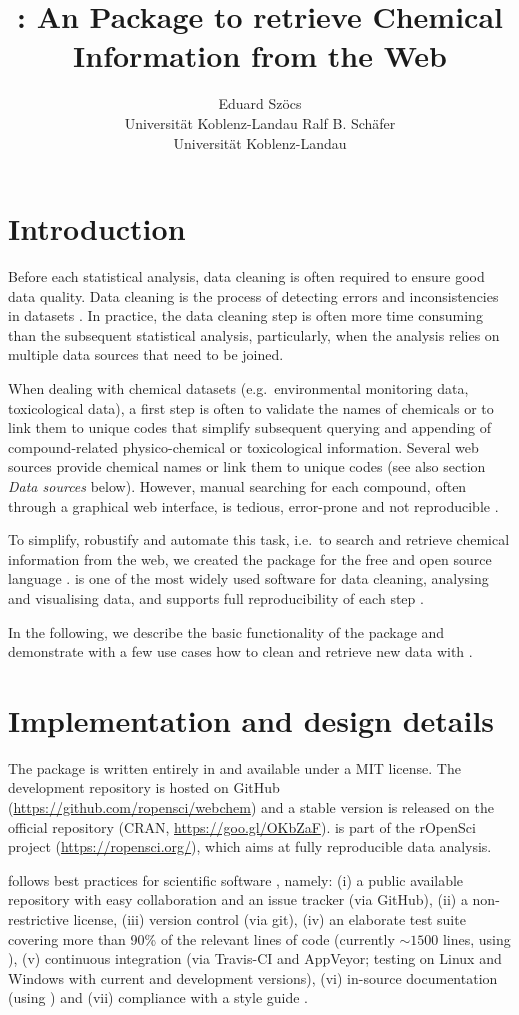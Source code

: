 \documentclass[article, shortnames]{jss}\usepackage[]{graphicx}\usepackage[]{color}
\author{Eduard Sz\"ocs\\Universit\"at Koblenz-Landau \And 
        Ralf B. Sch\"afer\\Universit\"at Koblenz-Landau}
\title{\pkg{webchem}: An \proglang{R} Package to retrieve Chemical Information from the Web}
\begin{document}
\section[Introduction]{Introduction}
Before each statistical analysis, data cleaning is often required to ensure good data quality.
Data cleaning is the process of detecting errors and inconsistencies in datasets \citep{Chapman_2005}.
In practice, the data cleaning step is often more time consuming than the subsequent statistical analysis, particularly, when the analysis relies on multiple data sources that need to be joined.

When dealing with chemical datasets (e.g.\ environmental monitoring data, toxicological data), a first step is often to validate the names of chemicals or to link them to unique codes that simplify subsequent querying and appending of compound-related physico-chemical or toxicological information.
Several web sources provide chemical names or link them to unique codes (see also section \emph{Data sources} below).
However, manual searching for each compound, often through a graphical web interface, is tedious, error-prone and not reproducible \citep{Peng_2009}.

To simplify, robustify and automate this task, i.e.\ to search and retrieve chemical information from the web, we created the  package for the free and open source  language \citep{r_2015, Wehrens_2011}.
 is one of the most widely used software for data cleaning, analysing and visualising data, and supports full reproducibility of each step \citep{Marwick_2016}.

In the following, we describe the basic functionality of the package and demonstrate with a few use cases how to clean and retrieve new data with .


\section[Implementation and design details]{Implementation and design details}
The  package is written entirely in  and available under a MIT license.
The development repository is hosted on GitHub (\url{https://github.com/ropensci/webchem}) and a stable version is released on the official  repository (CRAN, \url{https://goo.gl/OKbZaF}).
 is part of the rOpenSci project (\url{https://ropensci.org/}), which aims at fully reproducible data analysis.

 follows best practices for scientific software \citep{wilson_best_2014, poisot_best_2015}, namely: (i) a public available repository with easy collaboration and an issue tracker (via GitHub), (ii) a non-restrictive license, (iii) version control (via git), (iv) an elaborate test suite covering more than 90\% of the relevant lines of code (currently $\sim 1500$ lines, using  \citep{wickham_testthat:_2011}), (v) continuous integration (via Travis-CI and AppVeyor; testing on Linux and Windows with current and development  versions), (vi) in-source documentation (using  \citep{wickham_roxygen2:_2015}) and (vii) compliance with a style guide \citep{wickham_advanced_2015}.
\end{document}
